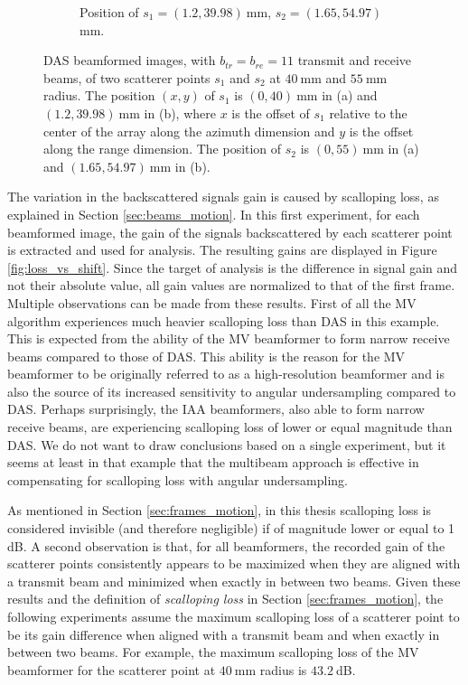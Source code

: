 \begin{figure}[ht]
\begin{subfigure}[t]{0.48\linewidth}
        \caption{Position of $s_1 = (1.2, 39.98)~$mm, $s_2 = (1.65, 54.97)~$mm.}
        \label{fig:DAS_frame2}
    \end{subfigure}
	\caption[DAS beamformed images, with $b_{tr} = b_{re} = 11$ transmit and receive beams, of two scatterer points $s_1$ and $s_2$ at $40~$mm and $55~$mm radius.]{DAS beamformed images, with $b_{tr} = b_{re} = 11$ transmit and receive beams, of two scatterer points $s_1$ and $s_2$ at $40~$mm and $55~$mm radius. The position $(x, y)$ of $s_1$ is $(0, 40)~$mm in (a) and $(1.2, 39.98)~$mm in (b), where $x$ is the offset of $s_1$ relative to the center of the array along the azimuth dimension and $y$ is the offset along the range dimension. The position of $s_2$ is $(0, 55)~$mm in (a) and $(1.65, 54.97)~$mm in (b).}
	\label{fig:DAS_frame}
\end{figure}

The variation in the backscattered signals gain is caused by scalloping loss, as explained in Section \ref{sec:beams_motion}. In this first experiment, for each beamformed image, the gain of the signals backscattered by each scatterer point is extracted and used for analysis.
The resulting gains are displayed in Figure \ref{fig:loss_vs_shift}.
Since the target of analysis is the difference in signal gain and not their absolute value, all gain values are normalized to that of the first frame.
Multiple observations can be made from these results. First of all the MV algorithm experiences much heavier scalloping loss than DAS in this example.
This is expected from the ability of the MV beamformer to form narrow receive beams compared to those of DAS.
This ability is the reason for the MV beamformer to be originally referred to as a high-resolution beamformer and is also the source of its increased sensitivity to angular undersampling compared to DAS.
Perhaps surprisingly, the IAA beamformers, also able to form narrow receive beams, are experiencing scalloping loss of lower or equal magnitude than DAS.
We do not want to draw conclusions based on a single experiment, but it seems at least in that example that the multibeam approach is effective in compensating for scalloping loss with angular undersampling.

As mentioned in Section \ref{sec:frames_motion}, in this thesis scalloping loss is considered invisible (and therefore negligible) if of magnitude lower or equal to 1 dB. 
A second observation is that, for all beamformers, the recorded gain of the scatterer points consistently appears to be maximized when they are aligned with a transmit beam and minimized when exactly in between two beams.
Given these results and the definition of \textit{scalloping loss} in Section \ref{sec:frames_motion}, the following experiments assume the maximum scalloping loss of a scatterer point to be its gain difference when aligned with a transmit beam and when exactly in between two beams. For example, the maximum scalloping loss of the MV beamformer for the scatterer point at $40~$mm radius is $43.2~$dB.

